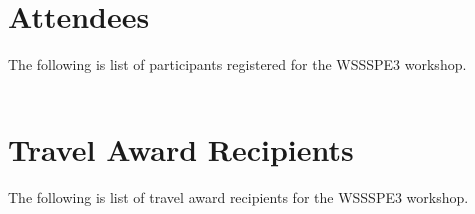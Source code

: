 \documentclass[11pt, oneside]{amsart}
\newcommand{\todo}[1]{{\color{blue}$\blacksquare$~\textsf{[TODO: #1]}}}
\begin{document}
{\scriptsize
\begin{longtable}{lll}

\end{longtable}
}
 

\section{Attendees}  \label{sec:attendees}
The following is list of participants registered for the WSSSPE3 workshop.

{\scriptsize
\begin{longtable}{lll}

\end{longtable}
}

\section{Travel Award Recipients}  \label{sec:awardees}
The following is list of travel award recipients for the WSSSPE3 workshop.

{\scriptsize
\begin{longtable}{lll}

\end{longtable}
}




%

%










\end{document}
